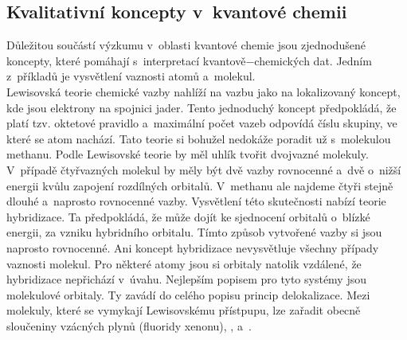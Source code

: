 \documentclass[
  printed, %
  table,   %
  lof,     %
  lot,     %
  oneside,
]{fithesis3}
\begin{document}
\subsection{Kvalitativní koncepty v~kvantové chemii}
Důležitou součástí výzkumu v~oblasti kvantové chemie jsou zjednodušené koncepty, které pomáhají s~interpretací kvantově$-$chemických dat. Jedním z~příkladů je vysvětlení vaznosti atomů a~molekul. \\
Lewisovská teorie chemické vazby nahlíží na vazbu jako na lokalizovaný koncept, kde jsou elektrony na spojnici jader. Tento jednoduchý koncept předpokládá, že platí tzv. oktetové pravidlo a~maximální počet vazeb odpovídá číslu skupiny, ve které se atom nachází. Tato teorie si bohužel nedokáže poradit už s~molekulou methanu. Podle Lewisovské teorie by měl uhlík tvořit dvojvazné molekuly. V~případě čtyřvazných molekul by měly být dvě vazby rovnocenné a~dvě o~nižší energii kvůlu zapojení rozdílných orbitalů. V~methanu ale najdeme čtyři stejně dlouhé a~naprosto rovnocenné vazby. Vysvětlení této skutečnosti nabízí teorie hybridizace. Ta předpokládá, že může dojít ke sjednocení orbitalů o~blízké energii, za vzniku hybridního orbitalu. Tímto způsob vytvořené vazby si jsou naprosto rovnocenné. Ani koncept hybridizace nevysvětluje všechny případy vaznosti molekul. Pro některé atomy jsou si orbitaly natolik vzdálené, že hybridizace nepřichází v~úvahu. Nejlepším popisem pro tyto systémy jsou molekulové orbitaly. Ty zavádí do celého popisu princip delokalizace. Mezi molekuly, které se vymykají Lewisovskému přístpupu, lze zařadit obecně sloučeniny vzácných plynů (fluoridy xenonu),  ,  a~. \\
\end{document}
